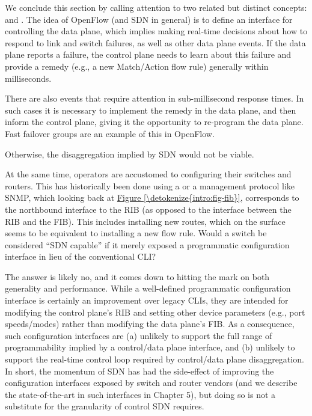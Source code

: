 \documentclass[letterpaper,11pt,english]{sphinxmanual}
\begin{document}
We conclude this section by calling attention to two related but
distinct concepts:  and . The idea of OpenFlow
(and SDN in general) is to define an interface for controlling the
data plane, which implies making real-time decisions about how to
respond to link and switch failures, as well as other data plane
events. If the data plane reports a failure, the control plane needs
to learn about this failure and provide a remedy (e.g., a new
Match/Action flow rule) generally within milliseconds. %
\begin{footnote}[2]\sphinxAtStartFootnote
There are also events that require attention in sub-millisecond
response times. In such cases it is necessary to implement the
remedy in the data plane, and then inform the control plane,
giving it the opportunity to re-program the data plane. Fast
failover groups are an example of this in OpenFlow.
%
\end{footnote}  Otherwise, the
disaggregation implied by SDN would not be viable.

At the same time, operators are accustomed to configuring their
switches and routers. This has historically been done using a  or a management protocol like SNMP, which
looking back at \hyperref[\detokenize{intro:fig-fib}]{Figure \ref{\detokenize{intro:fig-fib}}}, corresponds to the
northbound interface to the RIB (as opposed to the interface between
the RIB and the FIB). This includes installing new routes, which on
the surface seems to be equivalent to installing a new flow
rule. Would a switch be considered “SDN capable” if it merely exposed
a programmatic configuration interface in lieu of the conventional
CLI?

The answer is likely no, and it comes down to hitting the mark on both
generality and performance. While a well-defined programmatic
configuration interface is certainly an improvement over legacy CLIs,
they are intended for modifying the control plane’s RIB and setting
other device parameters (e.g., port speeds/modes) rather than
modifying the data plane’s FIB. As a consequence, such configuration
interfaces are (a) unlikely to support the full range of
programmability implied by a control/data plane interface, and (b)
unlikely to support the real-time control loop required by
control/data plane disaggregation. In short, the momentum of SDN has
had the side-effect of improving the configuration interfaces exposed
by switch and router vendors (and we describe the state-of-the-art in
such interfaces in Chapter 5), but doing so is not a substitute for
the granularity of control SDN requires.
\end{document}
